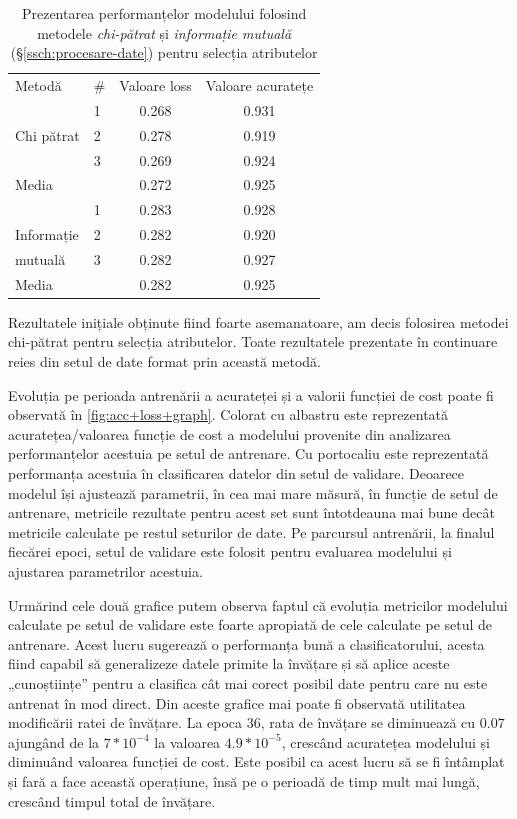 \begin{table}[h]
\centering
\caption{Prezentarea performanțelor modelului folosind metodele \textit{chi-pătrat} și \textit{informație mutuală} (\S\ref{ssch:procesare-date}) pentru selecția atributelor}
\label{tabel:acc+loss+comparison}
\renewcommand{\arraystretch}{1.2}
\begin{tabular}{@{}llcc@{}}
\rowcolor{gray!50} Metodă & \# & Valoare loss & Valoare acuratețe \\ 
& 1 & 0.268 & 0.931 \\
Chi pătrat & 2 & 0.278 & 0.919 \\
& 3 & 0.269 & 0.924 \\
\rowcolor{gray!15} Media & & 0.272 & 0.925 \\
& 1 & 0.283 & 0.928 \\{}
Informație & 2 & 0.282 & 0.920 \\
mutuală & 3 & 0.282 & 0.927 \\
\rowcolor{gray!15} Media & & 0.282 & 0.925 \\
\end{tabular}
\end{table}

Rezultatele inițiale obținute fiind foarte asemanatoare, am decis folosirea metodei chi-pătrat pentru selecția atributelor. Toate rezultatele prezentate în continuare reies din setul de date format prin această metodă.

Evoluția pe perioada antrenării a acurateței și a valorii funcției de cost poate fi observată în \autoref{fig:acc+loss+graph}. Colorat cu albastru este reprezentată acuratețea/valoarea funcție de cost a modelului provenite din analizarea performanțelor acestuia pe setul de antrenare. Cu portocaliu este reprezentată performanța acestuia în clasificarea datelor din setul de validare. Deoarece modelul își ajustează parametrii, în cea mai mare măsură, în funcție de setul de antrenare, metricile rezultate pentru acest set sunt întotdeauna mai bune decât metricile calculate pe restul seturilor de date. Pe parcursul antrenării, la finalul fiecărei epoci, setul de validare este folosit pentru evaluarea modelului și ajustarea parametrilor acestuia. 

Urmărind cele două grafice putem observa faptul că evoluția metricilor modelului calculate pe setul de validare este foarte apropiată de cele calculate pe setul de antrenare. Acest lucru sugerează o performanța bună a clasificatorului, acesta fiind capabil să generalizeze datele primite la învățare și să aplice aceste „cunoștiințe” pentru a clasifica cât mai corect posibil date pentru care nu este antrenat în mod direct. Din aceste grafice mai poate fi observată utilitatea modificării ratei de învățare. La epoca 36, rata de învățare se diminuează cu $0.07$ ajungând de la $7*10^{-4}$ la valoarea $4.9*10^{-5}$, crescând acuratețea modelului și diminuând valoarea funcției de cost. Este posibil ca acest lucru să se fi întâmplat și fară a face această operațiune, însă pe o perioadă de timp mult mai lungă, crescând timpul total de învățare.

